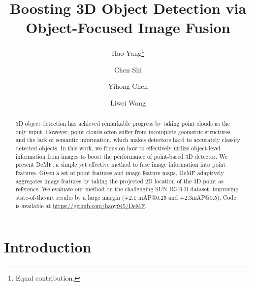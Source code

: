 \documentclass[runningheads]{llncs}
\begin{document}
\pagestyle{headings}
\mainmatter

\title{Boosting 3D Object Detection via Object-Focused Image Fusion} 

\begin{comment}
\titlerunning{ECCV-22 submission ID \ECCVSubNumber} 
\authorrunning{ECCV-22 submission ID \ECCVSubNumber} 
\author{Anonymous ECCV submission}
\end{comment}


\author{Hao Yang\thanks{Equal contribution.} \and
Chen Shi  \and
Yihong Chen \and
Liwei Wang 
}

\maketitle

\begin{abstract}

3D object detection has achieved remarkable progress by taking point clouds as the only input. However, point clouds often suffer from incomplete geometric structures and the lack of semantic information, which makes detectors hard to accurately classify detected objects. In this work, we focus on how to effectively utilize object-level information from images to boost the performance of point-based 3D detector. We present DeMF, a simple yet effective method to fuse image information into point features. 
Given a set of point features and image feature maps, DeMF adaptively aggregates image features by taking the projected 2D location of the 3D point as reference. 
We evaluate our method on the challenging SUN RGB-D dataset, improving state-of-the-art results by a large margin (+2.1 mAP@0.25 and +2.3mAP@0.5). Code is available at \href{https://github.com/haoy945/DeMF}{https://github.com/haoy945/DeMF}.

\end{abstract}




\section{Introduction}
\end{document}
